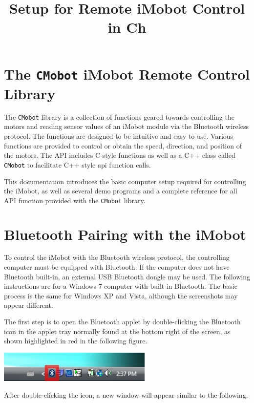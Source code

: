 \documentclass{article}
\title{Setup for Remote iMobot Control in Ch}
\begin{document}
\maketitle

\section{The \texttt{CMobot} iMobot Remote Control Library}
The \texttt{CMobot} library is a collection of functions geared towards
controlling the motors and reading sensor values of an iMobot module via the
Bluetooth wireless protocol. The functions are designed to be intuitive
and easy to use. Various functions are provided to control or obtain the speed,
direction, and position of the motors. The API includes C-style functions as well
as a C++ class called \texttt{CMobot} to facilitate C++ style api function
calls. 

This documentation introduces the basic computer setup required for controlling 
the iMobot, as well as several demo programs and a complete reference for all
API function provided with the \texttt{CMobot} library.

\section{Bluetooth Pairing with the iMobot}
To control the iMobot with the Bluetooth wireless protocol, the controlling 
computer must be equipped with Bluetooth. If the computer does not have
Bluetooth built-in, an external USB Bluetooth dongle may be used. The following
instructions are for a Windows 7 computer with built-in Bluetooth. The basic
process is the same for Windows XP and Vista, although the screenshots may
appear different. 

The first step is to open the Bluetooth applet by double-clicking the Bluetooth
icon in the applet tray normally found at the bottom right of the screen, as
shown highlighted in red in the following figure.

\begin{center}
\includegraphics[width=3in]{images/imobot_connect_1.png}
\end{center}

After double-clicking the icon, a new window will appear similar to the following.
\end{document}
